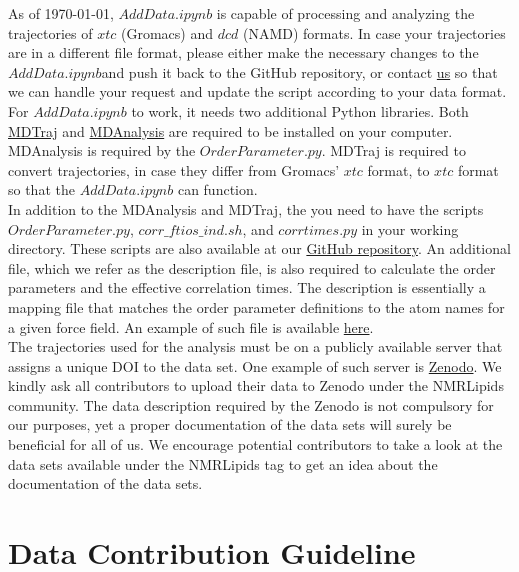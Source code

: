 \documentclass[12pt]{article}
\begin{document}
As of \today, $AddData.ipynb$ is capable of processing and analyzing the trajectories of $xtc$ (Gromacs) and $dcd$ (NAMD) formats. In case your trajectories are in a different file format, please either make the necessary changes to the $AddData.ipynb$and push it back to the GitHub repository, or contact \href{mailto:b.kav@fz-juelich.de}{us} so that we can handle your request and update the script according to your data format.\\

For $AddData.ipynb$ to work, it needs two additional Python libraries. Both \href{http://mdtraj.org/1.9.3/}{MDTraj} and \href{http://mdanalysis.org}{MDAnalysis} are required to be installed on your computer. MDAnalysis is required by the $OrderParameter.py$. MDTraj is required to convert trajectories, in case they differ from Gromacs' $xtc$ format, to $xtc$ format so that the $AddData.ipynb$ can function. \\

In addition to the MDAnalysis and MDTraj, the you need to have the scripts $OrderParameter.py$, $corr\_ftios\_ind.sh$, and $corrtimes.py$ in your working directory. These scripts are also available at our \href{https://github.com/NMRLipids/NMRlipidsVIpolarizableFFs}{GitHub repository}. An additional file, which we refer as the description file, is also required to calculate the order parameters and the effective correlation times. The description is essentially a mapping file that matches the order parameter definitions to the atom names for a given force field. An example of such file is available \href{https://github.com/NMRLipids/MATCH/blob/master/scripts/orderParm_defs/order_parameter_definitions_MODEL_CHARMM36_POPS.def}{here}.\\

The trajectories used for the analysis must be on a publicly available server that assigns a unique DOI to the data set. One example of such server is \href{http://zenodo.org}{Zenodo}. We kindly ask all contributors to upload their data to Zenodo under the NMRLipids community. The data description required by the Zenodo is not compulsory for our purposes, yet a proper documentation of the data sets will surely be beneficial for all of us. We encourage potential contributors to take a look at the data sets available under the NMRLipids tag to get an idea about the documentation of the data sets.\\

\section{Data Contribution Guideline}
\end{document}
